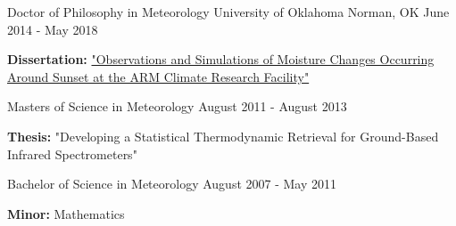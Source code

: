 
\begin{cventries}
  \cventry
    {Doctor of Philosophy in Meteorology} %
    {University of Oklahoma} %
    {Norman, OK} %
    {June 2014 - May 2018} %
    {
      \begin{cvitems} %
         \item {\textbf{Dissertation:} \href{https://shareok.org/handle/11244/299948}{"Observations and Simulations of Moisture Changes Occurring Around Sunset at the ARM Climate Research Facility"}}
         \vspace{0.5mm}
      \end{cvitems}}
  \cventry
    {Masters of Science in Meteorology} %
    {} %
    {} %
    {August 2011 - August 2013} %
    {
      \begin{cvitems} %
         \item {\textbf{Thesis:} "Developing a Statistical Thermodynamic Retrieval for Ground-Based Infrared Spectrometers"}
         \vspace{0.5mm}
      \end{cvitems}
    }
  \cventry
    {Bachelor of Science in Meteorology} %
    {} %
    {} %
    {August 2007 - May 2011}
    {
        \begin{cvitems} %
        \item {\textbf{Minor:} Mathematics}
        \vspace{0.5mm}
      \end{cvitems}
    } %

\end{cventries}
